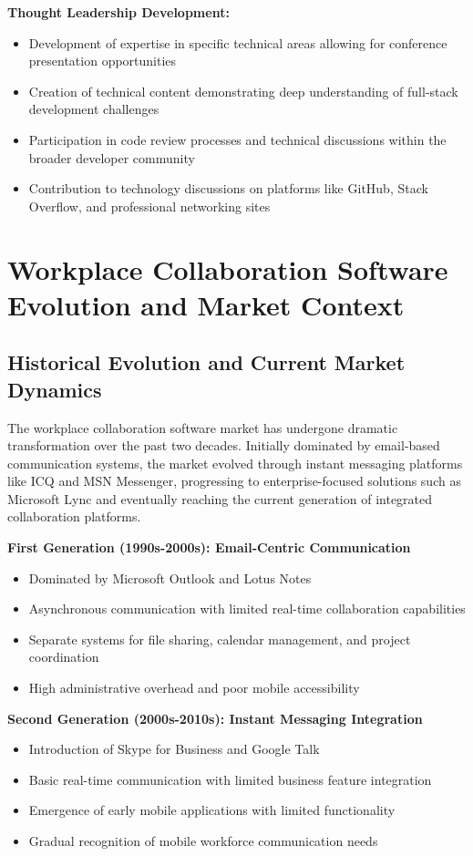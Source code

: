 \textbf{Thought Leadership Development:}
\begin{itemize}
    \item Development of expertise in specific technical areas allowing for conference presentation opportunities
    \item Creation of technical content demonstrating deep understanding of full-stack development challenges
    \item Participation in code review processes and technical discussions within the broader developer community
    \item Contribution to technology discussions on platforms like GitHub, Stack Overflow, and professional networking sites
\end{itemize}

\section{Workplace Collaboration Software Evolution and Market Context}

\subsection{Historical Evolution and Current Market Dynamics}

The workplace collaboration software market has undergone dramatic transformation over the past two decades. Initially dominated by email-based communication systems, the market evolved through instant messaging platforms like ICQ and MSN Messenger, progressing to enterprise-focused solutions such as Microsoft Lync and eventually reaching the current generation of integrated collaboration platforms.

\textbf{First Generation (1990s-2000s): Email-Centric Communication}
\begin{itemize}
    \item Dominated by Microsoft Outlook and Lotus Notes
    \item Asynchronous communication with limited real-time collaboration capabilities
    \item Separate systems for file sharing, calendar management, and project coordination
    \item High administrative overhead and poor mobile accessibility
\end{itemize}

\textbf{Second Generation (2000s-2010s): Instant Messaging Integration}
\begin{itemize}
    \item Introduction of Skype for Business and Google Talk
    \item Basic real-time communication with limited business feature integration
    \item Emergence of early mobile applications with limited functionality
    \item Gradual recognition of mobile workforce communication needs
\end{itemize}

